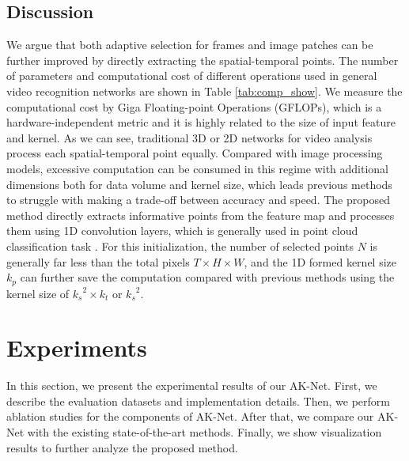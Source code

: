 \documentclass[journal]{IEEEtran}
\begin{document}
\subsection{Discussion}
We argue that both adaptive selection for frames and image patches can be further improved by directly extracting the spatial-temporal points.
The number of parameters and computational cost of different operations used in general video recognition networks are shown in Table \ref{tab:comp_show}.
We measure the computational cost by Giga Floating-point Operations (GFLOPs), which is a hardware-independent metric and it is highly related to the size of input feature and kernel.
As we can see, traditional 3D or 2D networks for video analysis process each spatial-temporal point equally.
Compared with image processing models, excessive computation can be consumed in this regime with additional dimensions both for data volume and kernel size, which leads previous methods to struggle with making a trade-off between accuracy and speed.
The proposed method directly extracts informative points from the feature map and processes them using 1D convolution layers, which is generally used in point cloud classification task \cite{qi2017pointnet, qi2017pointnet++}.
For this initialization, the number of selected points $N$ is generally far less than the total pixels $T\times H\times W$, and the 1D formed kernel size $k_p$ can further save the computation compared with previous methods using the kernel size of ${k_s}^2\times k_t$ or ${k_s}^2$.

\section{Experiments} \label{sec:experiment}
In this section, we present the experimental results of our AK-Net.
First, we describe the evaluation datasets and implementation details.
Then, we perform ablation studies for the components of AK-Net.
After that, we compare our AK-Net with the existing state-of-the-art methods.
Finally, we show visualization results to further analyze the proposed method.
\end{document}
